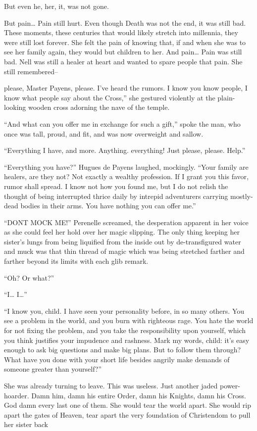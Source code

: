 But even he, her, it, was not gone.

But pain… Pain still hurt. Even though Death was not the end, it was still bad. These moments, these centuries that would likely stretch into millennia, they were still lost forever. She felt the pain of knowing that, if and when she was to see her family again, they would but children to her. And pain… Pain was still bad. Nell was still a healer at heart and wanted to spare people that pain. She still remembered–

please, Master Payens, please. I’ve heard the rumors. I know you know people, I know what people say about the Cross,” she gestured violently at the plain-looking wooden cross adorning the nave of the temple.

“And what can you offer me in exchange for such a gift,” spoke the man, who once was tall, proud, and fit, and was now overweight and sallow.

“Everything I have, and more. Anything. everything! Just please, please. Help.”

“Everything you have?” Hugues de Payens laughed, mockingly. “Your family are healers, are they not? Not exactly a wealthy profession. If I grant you this favor, rumor shall spread. I know not how you found me, but I do not relish the thought of being interrupted thrice daily by intrepid adventurers carrying mostly-dead bodies in their arms. You have nothing you can offer me.”

“DONT MOCK ME!” Perenelle screamed, the desperation apparent in her voice as she could feel her hold over her magic slipping. The only thing keeping her sister’s lungs from being liquified from the inside out by de-transfigured water and muck was that thin thread of magic which was being stretched farther and farther beyond its limits with each glib remark.

“Oh? Or what?”

“I… I…”

“I know you, child. I have seen your personality before, in so many others. You see a problem in the world, and you burn with righteous rage. You hate the world for not fixing the problem, and you take the responsibility upon yourself, which you think justifies your impudence and rashness. Mark my words, child: it’s easy enough to ask big questions and make big plans. But to follow them through? What have you done with your short life besides angrily make demands of someone greater than yourself?”

She was already turning to leave. This was useless. Just another jaded power-hoarder. Damn him, damn his entire Order, damn his Knights, damn his Cross. God damn every last one of them. She would tear the world apart. She would rip apart the gates of Heaven, tear apart the very foundation of Christendom to pull her sister back
\doubleline

